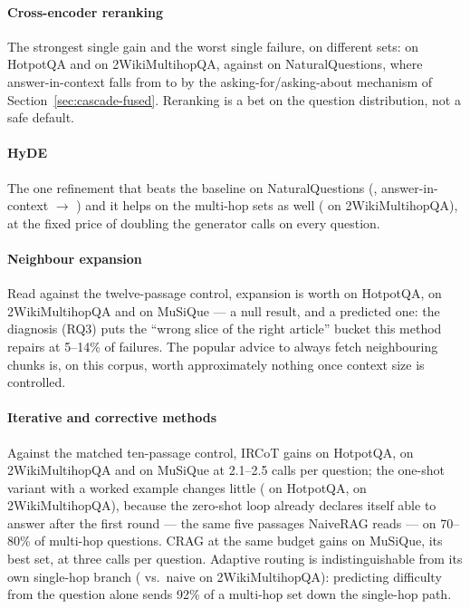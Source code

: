 \paragraph{Cross-encoder reranking} The strongest single gain and the
worst single failure, on different sets: \NaiveVsRerankHotpotQAExactMatchDiff{}
on HotpotQA and \NaiveVsRerankTwoWikiExactMatchDiff{} on 2WikiMultihopQA,
against \NaiveVsRerankNQExactMatchDiff{} on NaturalQuestions, where
answer-in-context falls from \NaiveRAGNQAnswerInContext{} to
\RerankNQAnswerInContext{} by the asking-for/asking-about mechanism of
Section~\ref{sec:cascade-fused}. Reranking is a bet on the question
distribution, not a safe default.

\paragraph{HyDE} The one refinement that beats the baseline on
NaturalQuestions (\NaiveVsHyDENQExactMatchDiff{}, answer-in-context
\NaiveRAGNQAnswerInContext{} $\rightarrow$ \HyDENQAnswerInContext) and it
helps on the multi-hop sets as well
(\NaiveVsHyDETwoWikiExactMatchDiff{} on 2WikiMultihopQA), at the fixed
price of doubling the generator calls on every question.

\paragraph{Neighbour expansion} Read against the twelve-passage control,
expansion is worth \NaiveTwelveVsNeighbourHotpotQAExactMatchDiff{} on
HotpotQA, \NaiveTwelveVsNeighbourTwoWikiExactMatchDiff{} on
2WikiMultihopQA and \NaiveTwelveVsNeighbourMuSiQueExactMatchDiff{} on
MuSiQue --- a null result, and a predicted one: the diagnosis
(RQ3) puts the ``wrong slice of the right article'' bucket this method
repairs at 5--14\% of failures. The popular advice to always fetch
neighbouring chunks is, on this corpus, worth approximately nothing once
context size is controlled.

\paragraph{Iterative and corrective methods} Against the matched
ten-passage control, IRCoT gains
\NaiveTenVsIRCoTHotpotQAExactMatchDiff{} on HotpotQA,
\NaiveTenVsIRCoTTwoWikiExactMatchDiff{} on 2WikiMultihopQA and
\NaiveTenVsIRCoTMuSiQueExactMatchDiff{} on MuSiQue at 2.1--2.5 calls per
question; the one-shot variant with a worked example changes little
(\IRCoTVsIRCoTOneShotHotpotQAExactMatchDiff{} on HotpotQA,
\IRCoTVsIRCoTOneShotTwoWikiExactMatchDiff{} on 2WikiMultihopQA), because
the zero-shot loop already declares itself able to answer after the first
round --- the same five passages NaiveRAG reads --- on 70--80\% of
multi-hop questions. CRAG at the same budget gains
\NaiveTenVsCRAGTenMuSiQueExactMatchDiff{} on MuSiQue, its best set, at
three calls per question. Adaptive routing is indistinguishable from its
own single-hop branch (\NaiveVsAdaptiveTwoWikiExactMatchDiff{} vs.\ naive
on 2WikiMultihopQA): predicting difficulty from the question alone sends
92\% of a multi-hop set down the single-hop path.

